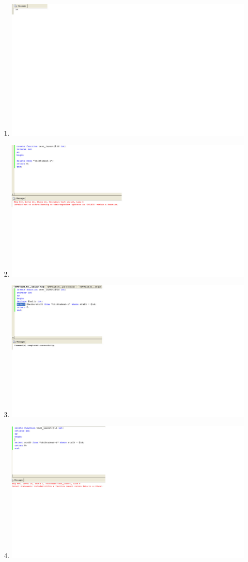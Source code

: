 \documentclass{article}
\begin{document}
\begin{enumerate}
	\item
		\includegraphics[scale=0.5]{figs/im-6-exec.jpg}
	\item
		\includegraphics[scale=0.5]{figs/im-7-exec-delete.jpg}
	\item
		\includegraphics[scale=0.5]{figs/im-7-exec-select.jpg}
	\item
		\includegraphics[scale=0.5]{figs/im-7-exec-select-error.jpg}

\end{enumerate}
\end{document}

